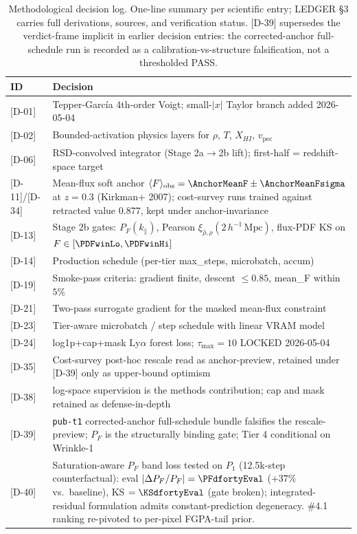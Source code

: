 \begin{table}[t]
    \centering
    \renewcommand{\arraystretch}{1.15}
    \setlength{\tabcolsep}{4pt}
    \begin{tabular}{l|p{}}
    ID & Decision \\
    \hline
    {[D-01]} & Tepper-Garc\'ia 4th-order Voigt; small-$|x|$ Taylor branch added 2026-05-04 \\
    {[D-02]} & Bounded-activation physics layers for $\rho$, $T$, $X_{HI}$, $v_{\text{pec}}$ \\
    {[D-06]} & RSD-convolved integrator (Stage 2a$\to$2b lift); first-half = redshift-space target \\
    {[D-11]/[D-34]} & Mean-flux soft anchor $\langle F\rangle_{\text{obs}} = \AnchorMeanF \pm \AnchorMeanFsigma$ at $z=0.3$ (Kirkman+ 2007); cost-survey runs trained against retracted value $0.877$, kept under anchor-invariance \\
    {[D-13]} & Stage 2b gates: $P_F(k_\parallel)$, Pearson $\xi_{\hat\rho,\rho}(2\,h^{-1}\,\text{Mpc})$, flux-PDF KS on $F\in[\PDFwinLo,\PDFwinHi]$ \\
    {[D-14]} & Production schedule (per-tier max\_steps, microbatch, accum) \\
    {[D-19]} & Smoke-pass criteria: gradient finite, descent $\leq 0.85$, mean\_F within $5\%$ \\
    {[D-21]} & Two-pass surrogate gradient for the masked mean-flux constraint \\
    {[D-23]} & Tier-aware microbatch / step schedule with linear VRAM model \\
    {[D-24]} & log1p+cap+mask Ly$\alpha$ forest loss; $\tau_{\max}=10$ LOCKED 2026-05-04 \\
    {[D-35]} & Cost-survey post-hoc rescale read as anchor-preview, retained under [D-39] only as upper-bound optimism \\
    {[D-38]} & log-space supervision is the methods contribution; cap and mask retained as defense-in-depth \\
    {[D-39]} & \texttt{pub-t1} corrected-anchor full-schedule bundle falsifies the rescale-preview; $P_F$ is the structurally binding gate; Tier 4 conditional on Wrinkle-1 \\
    {[D-40]} & Saturation-aware $P_F$ band loss tested on $P_1$ (12.5k-step counterfactual): eval $|\Delta P_F/P_F|=\PFdfortyEval$ ($+37\%$ vs.\ baseline), KS $=\KSdfortyEval$ (gate broken); integrated-residual formulation admits constant-prediction degeneracy. \#4.1 ranking re-pivoted to per-pixel FGPA-tail prior. \\
    \end{tabular}
    \caption{Methodological decision log. One-line summary per scientific entry; LEDGER \S3 carries full derivations, sources, and verification status. [D-39] supersedes the verdict-frame implicit in earlier decision entries: the corrected-anchor full-schedule run is recorded as a calibration-vs-structure falsification, not a thresholded PASS.}
    \label{tab:decision-log}
\end{table}
